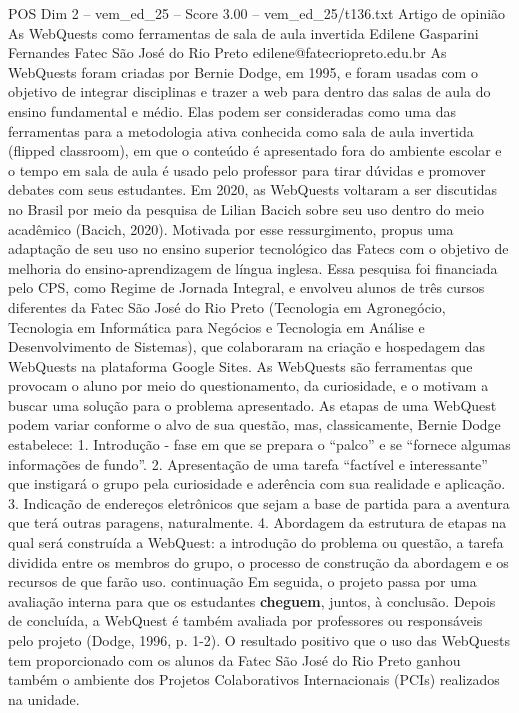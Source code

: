 \begin{textsample}{POS Dim 2 – vem\_ed\_25 – Score 3.00 – vem\_ed\_25/t136.txt}  \label{ex:f2_pos_137}
Artigo de opinião As WebQuests como ferramentas de sala de aula invertida Edilene Gasparini Fernandes Fatec São José do Rio Preto edilene@fatecriopreto.edu.br As WebQuests foram criadas por Bernie Dodge, em 1995, e foram usadas com o objetivo de integrar disciplinas e trazer a web para dentro das salas de aula do ensino fundamental e médio.
Elas podem ser consideradas como uma das ferramentas para a metodologia ativa conhecida como sala de aula invertida (flipped classroom), em que o conteúdo é apresentado fora do ambiente escolar e o tempo em sala de aula é usado pelo professor para tirar dúvidas e promover debates com seus estudantes.
Em 2020, as WebQuests voltaram a ser discutidas no Brasil por meio da pesquisa de Lilian Bacich sobre seu uso dentro do meio acadêmico (Bacich, 2020).
Motivada por esse ressurgimento, propus uma adaptação de seu uso no ensino superior tecnológico das Fatecs com o objetivo de melhoria do ensino-aprendizagem de língua inglesa.
Essa pesquisa foi financiada pelo CPS, como Regime de Jornada Integral, e envolveu alunos de três cursos diferentes da Fatec São José do Rio Preto (Tecnologia em Agronegócio, Tecnologia em Informática para Negócios e Tecnologia em Análise e Desenvolvimento de Sistemas), que colaboraram na criação e hospedagem das WebQuests na plataforma Google Sites.
As WebQuests são ferramentas que provocam o aluno por meio do questionamento, da curiosidade, e o motivam a buscar uma solução para o problema apresentado.
As etapas de uma WebQuest podem variar conforme o alvo de sua questão, mas, classicamente, Bernie Dodge estabelece: 1.
Introdução - fase em que se prepara o “palco” e se “fornece algumas informações de fundo”. 2.
Apresentação de uma tarefa “factível e interessante” que instigará o grupo pela curiosidade e aderência com sua realidade e aplicação. 3.
Indicação de endereços eletrônicos que sejam a base de partida para a aventura que terá outras paragens, naturalmente. 4.
Abordagem da estrutura de etapas na qual será construída a WebQuest: a introdução do problema ou questão, a tarefa dividida entre os membros do grupo, o processo de construção da abordagem e os recursos de que farão uso. continuação Em seguida, o projeto passa por uma avaliação interna para que os estudantes \textbf{cheguem}, juntos, à conclusão.
Depois de concluída, a WebQuest é também avaliada por professores ou responsáveis pelo projeto (Dodge, 1996, p. 1-2).
O resultado positivo que o uso das WebQuests tem proporcionado com os alunos da Fatec São José do Rio Preto ganhou também o ambiente dos Projetos Colaborativos Internacionais (PCIs) realizados na unidade.

\end{textsample}
